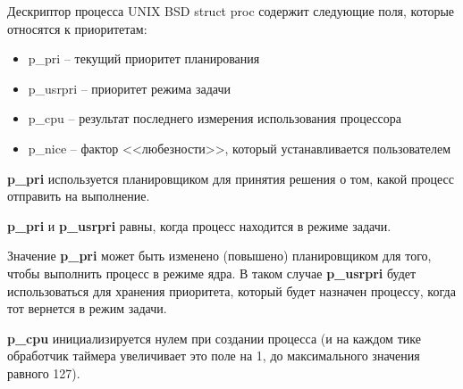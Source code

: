 Дескриптор процесса UNIX BSD struct proc содержит следующие поля, которые относятся к приоритетам:
\begin{itemize}[label*=---]
	\item p\_pri -- текущий приоритет планирования
	\item p\_usrpri -- приоритет режима задачи
	\item p\_cpu -- результат последнего измерения использования процессора
	\item p\_nice -- фактор <<любезности>>, который устанавливается пользователем
\end{itemize}

\textbf{p\_pri} используется планировщиком для принятия решения о том, какой процесс отправить на выполнение. 

\textbf{p\_pri} и \textbf{p\_usrpri} равны, когда процесс находится в режиме задачи. 

Значение \textbf{p\_pri} может быть изменено (повышено) планировщиком для того, чтобы выполнить процесс в режиме ядра. В таком случае \textbf{p\_usrpri} будет использоваться для хранения приоритета, который будет назначен процессу, когда тот вернется в режим задачи.

\textbf{p\_cpu} инициализируется нулем при создании процесса (и на каждом тике обработчик таймера увеличивает это поле на 1, до максимального значения равного 127).

